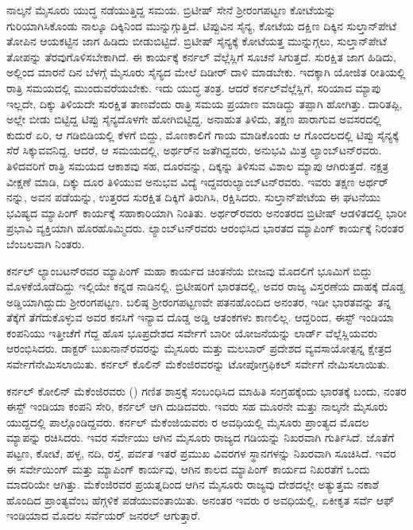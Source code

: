 ನಾಲ್ಕನೆ ಮೈಸೂರು ಯುದ್ಧ ನಡೆಯುತ್ತಿದ್ದ ಸಮಯ. ಬ್ರಿಟೀಷ್​ ಸೇನೆ ಶ‍್ರೀರಂಗಪಟ್ಟಣ ಕೋಟೆಯನ್ನು ಗುರಿಯಾಗಿಸಿಕೊಂಡು ನಾಲ್ಕೂ ದಿಕ್ಕಿನಿಂದ ಮುನ್ನುಗ್ಗುತ್ತಿದೆ. ಟಿಪ್ಪುವಿನ ಸೈನ್ಯ, ಕೋಟೆಯ ದಕ್ಷಿಣ ದಿಕ್ಕಿನ ಸುಲ್ತಾನ್​ಪೇಟೆ ತೋಪಿನ ಆಯಕಟ್ಟಿನ ಜಾಗ ಹಿಡಿದು ಬೀಡುಬಿಟ್ಟಿದೆ. ಬ್ರಿಟೀಷ್​ ಸೈನ್ಯಕ್ಕೆ ಕೋಟೆಯತ್ತ ಮುನ್ನುಗ್ಗಲು, ಸುಲ್ತಾನ್​ಪೇಟೆ ತೋಪನ್ನು ತೆರವುಗೊಳಿಸಬೇಕಾಗಿದೆ. ಈ ಕಾರ್ಯಕ್ಕೆ ಕರ್ನಲ್​ ವೆಲ್ಲೆಸ್ಲಿಗೆ ಸೂಚನೆ ಸಿಗುತ್ತದೆ. ಸುರಕ್ಷಿತ ಜಾಗ ಹಿಡಿದು, ಅಲ್ಲಿಂದ ಮಾರನೆ ದಿನ ಬೆಳಗ್ಗೆ ಮೈಸೂರು ಸೈನ್ಯದ ಮೇಲೆ ದಿಡೀರ್​ ದಾಳಿ ಮಾಡಬೇಕು. ಇದಕ್ಕಾಗಿ ಯೋಜಿತ ರೀತಿಯಲ್ಲಿ ರಾತ್ರಿ ಸಮಯದಲ್ಲಿ ಮುಂದುವರೆಯಬೇಕು. ಇದು ಯುದ್ಧ ತಂತ್ರ. ಆದರೆ ಕರ್ನಲ್​ ವೆಲ್ಲೆಸ್ಲಿಗೆ, ಸರಿಯಾದ ಮ್ಯಾಪು ಇಲ್ಲದೇ, ದಿಕ್ಕು ತಿಳಿಯದೇ ಸುರಕ್ಷಿತ ತಾಣವೆಂದು ರಾತ್ರಿ ಸಮಯ ಪ್ರಯಾಣ ಮಾಡಿದ್ದು ತಪ್ಪಾಗಿ ಹೋಗಿತ್ತು. ದಾರಿತಪ್ಪಿ, ಅಲ್ಲೇ ಬೀಡು ಬಿಟ್ಟಿದ್ದ ಟಿಪ್ಪು ಸೈನ್ಯದೊಳಗೇ ಹೋಗಿಬಿಟ್ಟಿದ್ದ. ಅನಾಹುತ ತಿಳಿದು, ತಕ್ಷಣ ಪಾರಾಗುವ ಅವಸರದಲ್ಲಿ ಕುದುರೆ ಏರಿ, ಆ ಗಡಿಬಿಡಿಯಲ್ಲಿ ಕೆಳಗೆ ಬಿದ್ದು, ಮೊಣಕಾಲಿಗೆ ಗಾಯ ಮಾಡಿಕೊಂಡು ಆ ಗೊಂದಲದಲ್ಲಿ ಟಿಪ್ಪು ಸೈನ್ಯಕ್ಕೆ ಸೆರೆ ಸಿಕ್ಕುವವನಿದ್ದ. ಆದರೆ, ಆ ಸಮಯದಲ್ಲಿ, ಅರ್ಥರ್​ನ ಜತೆಗಿದ್ದವರು, ಅನುಭವಿ ಮಿತ್ರ ಲ್ಯಾಂಬ್​ಟನ್​ರವರು. ತಿಳಿದವರಿಗೆ ರಾತ್ರಿ ಸಮಯದ ಆಕಾಶವು ಸಹ, ದೂರವನ್ನು, ದಿಕ್ಕನ್ನು ತಿಳಿಸುವ ವಿಶಾಲ ಮ್ಯಾಪು ಆಗಿರುತ್ತದೆ. ನಕ್ಷತ್ರ ವೀಕ್ಷಣೆ ಮಾಡಿ, ದಿಕ್ಕು ದೂರ ತಿಳಿಯುವ ಅನುಭವ ವಿದ್ಯೆ ಇದ್ದವರು\break ಲ್ಯಾಂಬ್​ಟನ್​ರವರು. ಇವರು ತಕ್ಷಣ ಅರ್ಥರ್​ನನ್ನು, ಅವನ ಪಡೆಯನ್ನು, ಉತ್ತರದ ಸುರಕ್ಷಿತ ದಿಕ್ಕಿಗೆ ತಿರುಗಿಸಿ, ರಕ್ಷಿಸಿದರು. ಸುಲ್ತಾನ್​ಪೇಟೆಯ ಈ ಘಟನೆಯು ಭವಿಷ್ಯದ ಮ್ಯಾಪಿಂಗ್​ ಕಾರ್ಯಕ್ಕೆ ಸಹಾಕಾರಿಯಾಗಿ ನಿಂತಿತು. ಅರ್ಥರ್​ರವರು ಅನಂತರದ ಬ್ರಿಟೀಷ್​ ಆಡಳಿತದಲ್ಲಿ ಭಾರೀ ಪ್ರಭಾವಿ ವ್ಯಕ್ತಿಯಾಗಿ ಹೊರಹೊಮ್ಮಿದರು. ಲ್ಯಾಂಬ್​ಟನ್​ರವರು ಆರಂಭಿಸಿದ ಭಾರತದ ಮ್ಯಾಪಿಂಗ್​ ಕಾರ್ಯಕ್ಕೆ ನಿರಂತರ ಬೆಂಬಲವಾಗಿ ನಿಂತರು.

ಕರ್ನಲ್​ ಲ್ಯಾಂಬಟನ್​ರವರ ಮ್ಯಾಪಿಂಗ್​ ಮಹಾ ಕಾರ್ಯದ ಚಿಂತನೆಯ ಬೀಜವು ಮೊದಲಿಗೆ ಭೂಮಿಗೆ ಬಿದ್ದು ಮೊಳಕೆಯೊಡೆದಿದ್ದು ಇಲ್ಲಿಯೇ ಕನ್ನಡ ನಾಡಿನಲ್ಲಿ. ಬ್ರಿಟೀಷರಿಗೆ ಭಾರತದಲ್ಲಿ, ಅವರ ರಾಜ್ಯ ವಿಸ್ತರಣೆಯ ದಾಹಕ್ಕೆ ದೊಡ್ಡ ಅಡ್ಡಿಯಾಗಿದ್ದುದು ಶ‍್ರೀರಂಗಪಟ್ಟಣ. ಬಲಿಷ್ಠ ಶ‍್ರೀರಂಗಪಟ್ಟಣವೇ ಪತನಹೊಂದಿದ ಅನಂತರ, ಇಡೀ ಭಾರತವನ್ನು ತನ್ನ ತೆಕ್ಕೆಗೆ ತೆಗೆದುಕೊಳ್ಳುವ ಅವರ ಕನಸಿಗೆ ಇನ್ಯಾವ ದೊಡ್ಡ ಅಡ್ಡಿ ಆತಂಕಗಳು ಕಾಣಲಿಲ್ಲ. ಆದ್ದರಿಂದ, ಈಸ್ಟ್​ ಇಂಡಿಯಾ ಕಂಪನಿಯು ಇತ್ತೀಚೆಗೆ ಗೆದ್ದ ಹೊಸ ಭೂಪ್ರದೇಶದ ಸರ್ವೇಗೆ ಬಾರೀ ಯೋಜನೆಯನ್ನು ಲಾರ್ಡ್ ವೆಲ್ಲೆಸ್ಲಿಯವರು ಆರಂಭಿಸಿದರು. ಡಾಕ್ಟರ್​ ಬುಖನಾನ್​ರವರನ್ನು ಮೈಸೂರು ಮತ್ತು ಮಲಬಾರ್​ ಪ್ರದೇಶದ ವ್ಯವಸಾಯೋತ್ಪನ್ನ ಕ್ಷೇತ್ರದ ಸರ್ವೇಗೆ\break ನೇಮಿಸಲಾಯಿತು. ಕರ್ನಲ್​ ಕೊಲಿನ್​ ಮೆಕೆಂಜಿರವರನ್ನು ಟೋಪೋಗ್ರಫಿಕಲ್​ ಸರ್ವೇಗೆ ನೇಮಿಸಲಾಯಿತು.

ಕರ್ನಲ್​ ಕೋಲಿನ್​ ಮೆಕೆಂಜಿರವರು () ಗಣಿತ ಶಾಸ್ರಕ್ಕೆ ಸಂಬಂಧಿಸಿದ ಮಾಹಿತಿ ಸಂಗ್ರಹಕ್ಕೆಂದು ಭಾರತಕ್ಕೆ ಬಂದು, ನಂತರ ಈಸ್ಟ್​ ಇಂಡಿಯಾ ಕಂಪನಿ ಸೇರಿ, ಕರ್ನಲ್​ ಆಗಿ ದುಡಿದವರು. ಇವರು ಸಹ ಮೂರನೇ ಮತ್ತು ನಾಲ್ಕನೇ ಮೈಸೂರು ಯುದ್ದದಲ್ಲಿ ಪಾಲ್ಗೊಂಡಿದ್ದವರು. ಕರ್ನಲ್​ ಮೆಕೆಂಜಿಯವರು ರ ಅವಧಿಯಲ್ಲಿ ಮೈಸೂರು ಪ್ರಾಂತ್ಯದ ಮೊದಲ ಮ್ಯಾಪನ್ನು ರಚಿಸಿದರು. ಇವರ ಸರ್ವೇಯು ಆಗಿನ ಮೈಸೂರು ರಾಜ್ಯದ ಗಡಿಯನ್ನು ನಿಖರವಾಗಿ ಗುರ್ತಿಸಿದೆ. ಜೊತೆಗೆ ಪಟ್ಟಣ, ಕೋಟೆ, ಹಳ್ಳ, ನದಿ, ರಸ್ತೆ, ಪರ್ವತ ಇತರೆ ಪ್ರಮುಖ ವಿವರಗಳ ಸ್ಥಾನಗಳನ್ನು ನಿಖರವಾಗಿ ಸೂಚಿಸಿದೆ. ಇವರ ಈ ಸರ್ವೇಯಿಂಗ್​ ಮತ್ತು ಮ್ಯಾಪಿಂಗ್​ ಕಾರ್ಯವು, ಆಗಿನ ಕಾಲದ ಮ್ಯಾಪಿಂಗ್​ ಕಾರ್ಯದ ನಿಖರತೆಗೆ ಒಂದು ಮಾದರಿಯೇ ಆಗಿತ್ತು. ಮೆಕೆಂಜಿರವರ ಪ್ರಯತ್ನದಿಂದ ಆಗಿನ ಮೈಸೂರು ರಾಜ್ಯವು ದೇಶದಲ್ಲೇ ಅತ್ಯುತ್ತಮ ನಕಾಶೆ ಹೊಂದಿದ ಪ್ರಾಂತ್ಯವೆಂಬ ಹೆಗ್ಗಳಿಕೆ ಪಡೆಯುವಂತಾಯಿತು. ಅನಂತರ ಇವರು ರ ಅವಧಿಯಲ್ಲಿ, ಏಕೀಕೃತ ಸರ್ವೆ ಆಫ್​ ಇಂಡಿಯಾದ ಮೊದಲ ಸರ್ವೆಯರ್​ ಜನರಲ್​ ಆಗುತ್ತಾರೆ.


